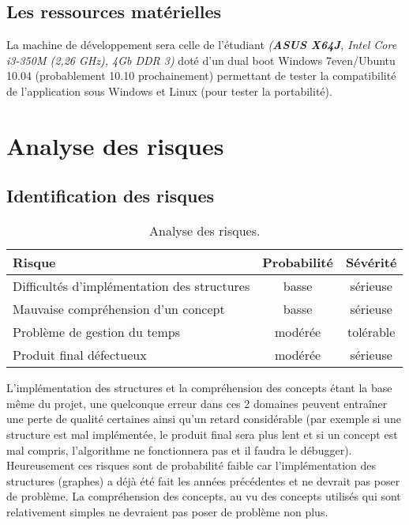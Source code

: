\documentclass[runningheads]{llncs}
\begin{document}
\subsection{Les ressources mat\'erielles}

La machine de développement sera celle de l'étudiant \textit{(\textbf{ASUS X64J}, Intel Core i3-350M (2,26 GHz), 4Gb DDR 3)}
doté d'un dual boot Windows 7even/Ubuntu 10.04 (probablement 10.10 prochainement) permettant de tester la compatibilité de 
l'application sous Windows et Linux (pour tester la portabilité).

\newpage
\section{Analyse des risques}

\subsection{Identification des risques}\label{sec:riskident}

\begin{table}[!htbp]
\begin{center}
\begin{tabular}{|p{3cm}||c|c|}
\hline
\textbf{Risque} & Probabilit\'e & S\'ev\'erit\'e\\
\hline\hline
Difficultés d'implémentation des structures & basse &  \large{s\'erieuse} \\
\hline
Mauvaise compréhension d'un concept & basse &  \large{s\'erieuse} \\
\hline
Problème de gestion du temps & \large{mod\'er\'ee} & tol\'erable \\
\hline
Produit final défectueux & \large{mod\'er\'ee} & \Large{sérieuse} \\
\hline
\end{tabular}
\end{center}
   \caption{Analyse des risques.}
   \label{tab:risques}
\end{table}

L'implémentation des structures et la compréhension des concepts étant la base même du projet, une quelconque erreur dans ces 2
domaines peuvent entraîner une perte de qualité certaines ainsi qu'un retard considérable (par exemple si une structure est mal 
implémentée, le produit final sera plus lent et si un concept est mal compris, l'algorithme ne fonctionnera pas et il faudra le 
débugger). Heureusement ces risques sont de probabilité faible car l'implémentation des structures (graphes) a déjà été fait les 
années précédentes et ne devrait pas poser de problème. La compréhension des concepts, au vu des concepts utilisés qui sont 
relativement simples ne devraient pas poser de problème non plus. \\
\end{document}

